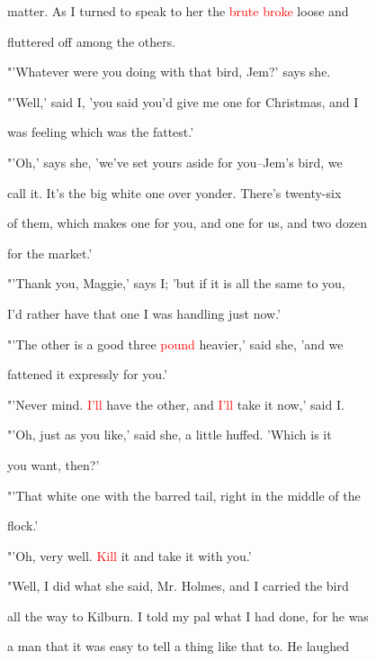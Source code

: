  matter. As I turned to speak to her the \textcolor{red}{brute} \textcolor{red}{broke} loose and

 fluttered off among the others.



 "'Whatever were you doing with that bird, Jem?' says she.



 "'Well,' said I, 'you said you'd give me one for Christmas, and I

 was feeling which was the fattest.'



 "'Oh,' says she, 'we've set yours aside for you--Jem's bird, we

 call it. It's the big \textcolor{BurntOrange}{white} one over yonder. There's twenty-six

 of them, which makes one for you, and one for us, and two dozen

 for the market.'



 "'Thank you, Maggie,' says I; 'but if it is all the same to you,

 I'd rather have that one I was handling just now.'



 "'The other is a \textcolor{BurntOrange}{good} three \textcolor{red}{pound} heavier,' said she, 'and we

 fattened it expressly for you.'



 "'Never mind. \textcolor{red}{I'll} have the other, and \textcolor{red}{I'll} take it now,' said I.



 "'Oh, just as you like,' said she, a little huffed. 'Which is it

 you want, then?'



 "'That \textcolor{BurntOrange}{white} one with the barred tail, right in the middle of the

 flock.'



 "'Oh, very well. \textcolor{red}{Kill} it and take it with you.'



 "Well, I did what she said, Mr. Holmes, and I carried the bird

 all the way to Kilburn. I told my pal what I had done, for he was

 a man that it was easy to tell a thing like that to. He \textcolor{BurntOrange}{laughed}

